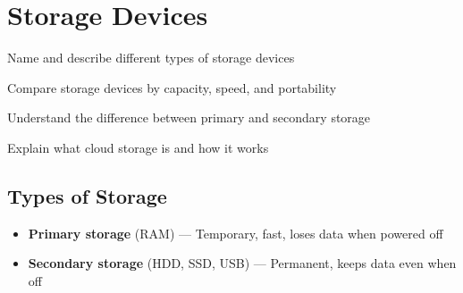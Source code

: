 
\chapter{Storage Devices}
\label{ch:storage}

\begin{objectives}
  \item Name and describe different types of storage devices
  \item Compare storage devices by capacity, speed, and portability
  \item Understand the difference between primary and secondary storage
  \item Explain what cloud storage is and how it works
\end{objectives}


\section{Types of Storage}
\label{sec:storage-types}

\begin{theorybox}
\begin{itemize}[leftmargin=*, label={\textcolor{ModuleBlue}{\faAngleRight}}, itemsep=4pt]
  \item \textbf{Primary storage} (RAM) --- Temporary, fast, loses data when powered off
  \item \textbf{Secondary storage} (HDD, SSD, USB) --- Permanent, keeps data even when off
\end{itemize}
\end{theorybox}

